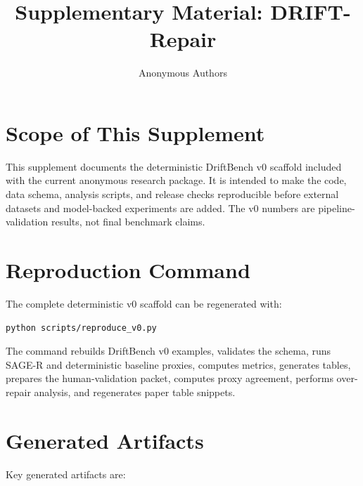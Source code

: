 \documentclass[10pt]{article}
\title{Supplementary Material: DRIFT-Repair}
\author{Anonymous Authors}
\date{}
\begin{document}
\maketitle

\section{Scope of This Supplement}

This supplement documents the deterministic DriftBench v0 scaffold included with the current anonymous research package. It is intended to make the code, data schema, analysis scripts, and release checks reproducible before external datasets and model-backed experiments are added. The v0 numbers are pipeline-validation results, not final benchmark claims.

\section{Reproduction Command}

The complete deterministic v0 scaffold can be regenerated with:

\begin{verbatim}
python scripts/reproduce_v0.py
\end{verbatim}

The command rebuilds DriftBench v0 examples, validates the schema, runs SAGE-R and deterministic baseline proxies, computes metrics, generates tables, prepares the human-validation packet, computes proxy agreement, performs over-repair analysis, and regenerates paper table snippets.

\section{Generated Artifacts}

Key generated artifacts are:
\end{document}
